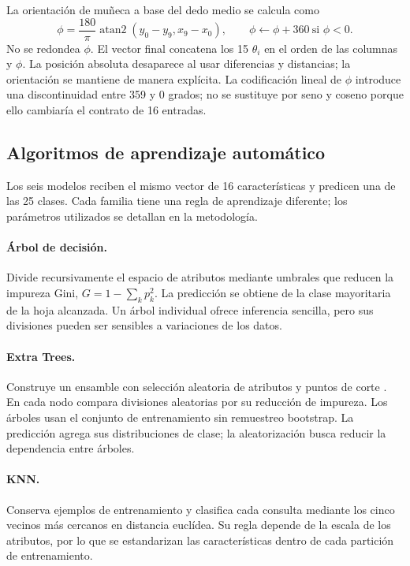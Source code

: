 \documentclass[11pt,a4paper]{article}
\begin{document}
La orientación de muñeca a base del dedo medio se calcula como
\begin{equation}
\phi=\frac{180}{\pi}\operatorname{atan2}(y_0-y_9,x_9-x_0),\qquad
\phi\leftarrow\phi+360\ \text{si }\phi<0.
\end{equation}
No se redondea $\phi$. El vector final concatena los 15 $\theta_i$ en el orden de las columnas y $\phi$. La posición absoluta desaparece al usar diferencias y distancias; la orientación se mantiene de manera explícita. La codificación lineal de $\phi$ introduce una discontinuidad entre 359 y 0 grados; no se sustituye por seno y coseno porque ello cambiaría el contrato de 16 entradas.

\subsection{Algoritmos de aprendizaje automático}
Los seis modelos reciben el mismo vector de 16 características y predicen una de las 25 clases. Cada familia tiene una regla de aprendizaje diferente; los parámetros utilizados se detallan en la metodología.

\paragraph{Árbol de decisión.} Divide recursivamente el espacio de atributos mediante umbrales que reducen la impureza Gini, $G=1-\sum_k p_k^2$. La predicción se obtiene de la clase mayoritaria de la hoja alcanzada. Un árbol individual ofrece inferencia sencilla, pero sus divisiones pueden ser sensibles a variaciones de los datos.

\paragraph{Extra Trees.} Construye un ensamble con selección aleatoria de atributos y puntos de corte \cite{geurts}. En cada nodo compara divisiones aleatorias por su reducción de impureza. Los árboles usan el conjunto de entrenamiento sin remuestreo bootstrap. La predicción agrega sus distribuciones de clase; la aleatorización busca reducir la dependencia entre árboles.

\paragraph{KNN.} Conserva ejemplos de entrenamiento y clasifica cada consulta mediante los cinco vecinos más cercanos en distancia euclídea. Su regla depende de la escala de los atributos, por lo que se estandarizan las características dentro de cada partición de entrenamiento.
\end{document}
